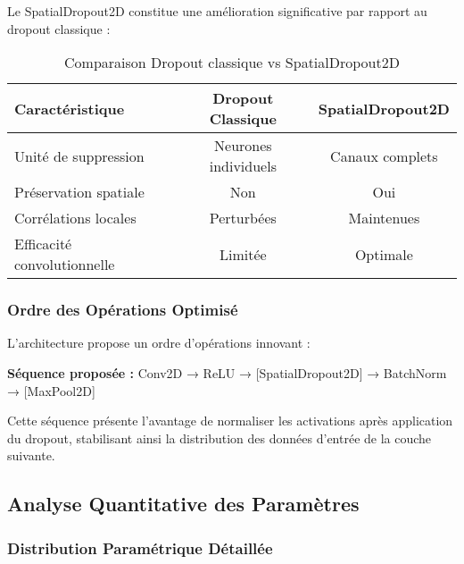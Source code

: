 \documentclass[12pt,a4paper]{article}
\begin{document}
Le SpatialDropout2D constitue une amélioration significative par rapport au dropout classique :

\begin{table}[H]
\centering
\caption{Comparaison Dropout classique vs SpatialDropout2D}
\begin{tabular}{lcc}
\toprule
\textbf{Caractéristique} & \textbf{Dropout Classique} & \textbf{SpatialDropout2D} \\
\midrule
Unité de suppression & Neurones individuels & Canaux complets \\
Préservation spatiale & Non & Oui \\
Corrélations locales & Perturbées & Maintenues \\
Efficacité convolutionnelle & Limitée & Optimale \\
\bottomrule
\end{tabular}
\end{table}

\subsubsection{Ordre des Opérations Optimisé}

L'architecture propose un ordre d'opérations innovant :

\textbf{Séquence proposée :} Conv2D → ReLU → [SpatialDropout2D] → BatchNorm → [MaxPool2D]

Cette séquence présente l'avantage de normaliser les activations après application du dropout, stabilisant ainsi la distribution des données d'entrée de la couche suivante.

\subsection{Analyse Quantitative des Paramètres}

\subsubsection{Distribution Paramétrique Détaillée}
\end{document}
